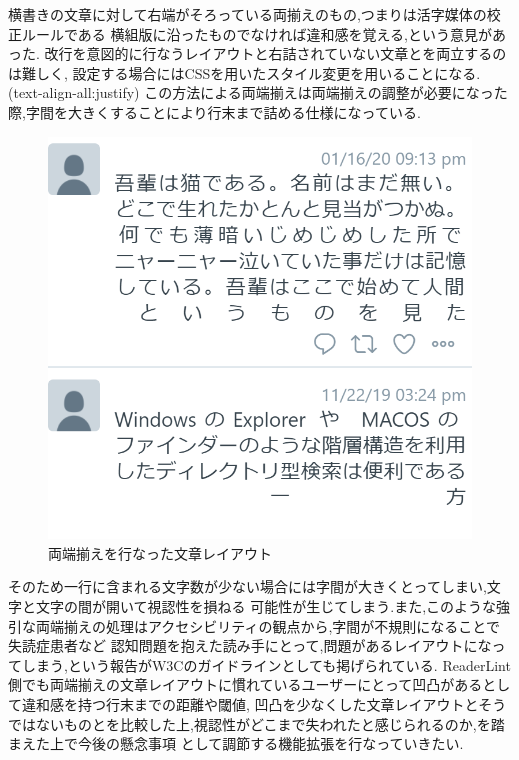 横書きの文章に対して右端がそろっている両揃えのもの,つまりは活字媒体の校正ルールである
横組版に沿ったものでなければ違和感を覚える,という意見があった.
改行を意図的に行なうレイアウトと右詰されていない文章とを両立するのは難しく,
設定する場合にはCSSを用いたスタイル変更を用いることになる.(text-align-all:justify)
この方法による両端揃えは両端揃えの調整が必要になった際,字間を大きくすることにより行末まで詰める仕様になっている.
\begin{figure}[H]
    \centering
    \label{fig:image9}
    \includegraphics[width=0.5\columnwidth]{image/04/img1.png}
    \caption[両端揃えを行なった文章レイアウト] {両端揃えを行なった文章レイアウト}
\end{figure}

そのため一行に含まれる文字数が少ない場合には字間が大きくとってしまい,文字と文字の間が開いて視認性を損ねる
可能性が生じてしまう.また,このような強引な両端揃えの処理はアクセシビリティの観点から,字間が不規則になることで失読症患者など
認知問題を抱えた読み手にとって,問題があるレイアウトになってしまう,という報告がW3Cのガイドラインとしても掲げられている.\cite{WCAG2.0} 
ReaderLint側でも両端揃えの文章レイアウトに慣れているユーザーにとって凹凸があるとして違和感を持つ行末までの距離や閾値,
凹凸を少なくした文章レイアウトとそうではないものとを比較した上,視認性がどこまで失われたと感じられるのか,を踏まえた上で今後の懸念事項
として調節する機能拡張を行なっていきたい.

